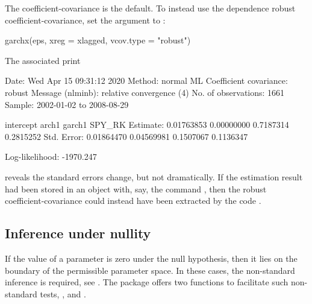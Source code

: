 The  coefficient-covariance is the default. To instead use the dependence robust coefficient-covariance, set the  argument to :
%
\begin{example}
	garchx(eps, xreg = xlagged, vcov.type = "robust")
\end{example}
%
The associated print
%
\begin{example}
	Date: Wed Apr 15 09:31:12 2020 
	Method: normal ML
	Coefficient covariance: robust 
	Message (nlminb): relative convergence (4) 
	No. of observations: 1661 
	Sample: 2002-01-02 to 2008-08-29 
	
	             intercept      arch1    garch1    SPY_RK
	Estimate:   0.01763853 0.00000000 0.7187314 0.2815252
	Std. Error: 0.01864470 0.04569981 0.1507067 0.1136347
	
	Log-likelihood: -1970.247
\end{example}
%
reveals the standard errors change, but not dramatically. If the estimation result had been stored in an object with, say, the command , then the robust coefficient-covariance could instead have been extracted by the code .

\subsection{Inference under nullity}

If the value of a parameter is zero under the null hypothesis, then it lies on the boundary of the permissible parameter space. In these cases, the non-standard inference is required, see \citet{FrancqThieu2018}. The  package offers two functions to facilitate such non-standard tests, , and .

